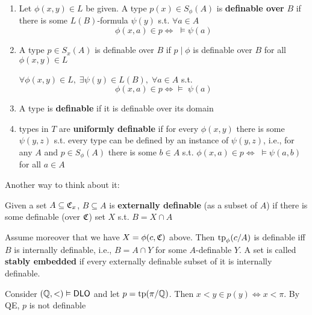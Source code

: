 \documentclass[11pt]{article}
\begin{document}
\begin{definition}[]
\begin{enumerate}
\item Let \(\phi(x,y)\in L\) be given. A type \(p(x)\in S_\phi(A)\) is \textbf{definable over} \(B\) if there is
some \(L(B)\)-formula \(\psi(y)\) s.t. \(\forall a\in A\)
\begin{equation*}
\phi(x,a)\in p\Leftrightarrow\;\vDash\psi(a)
\end{equation*}
\item A type \(p\in S_x(A)\) is definable over \(B\) if \(p\mid\phi\) is definable over \(B\) for
all \(\phi(x,y)\in L\)

\(\forall\phi(x,y)\in L,\;\exists\psi(y)\in L(B),\;\forall a\in A\) s.t.
\begin{equation*}
\phi(x,a)\in p\Leftrightarrow\vDash\;\psi(a)
\end{equation*}
\item A type is \textbf{definable} if it is definable over its domain
\item types in \(T\) are \textbf{uniformly definable} if for every \(\phi(x,y)\) there is some \(\psi(y,z)\) s.t.
every type can be defined by an instance of \(\psi(y,z)\), i.e., for any \(A\) and \(p\in S_\phi(A)\)
there is some \(b\in A\) s.t. \(\phi(x,a)\in p\Leftrightarrow\;\vDash\psi(a,b)\) for all \(a\in A\)
\end{enumerate}
\end{definition}

\begin{remark}
Another way to think about it:

Given a set \(A\subseteq\mathfrak{C}_x\), \(B\subseteq A\) is \textbf{externally definable} (as a subset of \(A\)) if there is some
definable (over \(\mathfrak{C}\)) set \(X\) s.t. \(B=X\cap A\)

Assume moreover that we have \(X=\phi(c,\mathfrak{C})\) above. Then \(\operatorname{tp}_\phi(c/A)\) is definable iff \(B\) is
internally definable, i.e., \(B=A\cap Y\) for some \(A\)-definable \(Y\). A set is called \textbf{stably
embedded} if every externally definable subset of it is internally definable.
\end{remark}

\begin{examplle}[]
Consider \((\mathbb{Q},<)\vDash\operatorname{\textsf{DLO}}\) and let \(p=\operatorname{tp}(\pi/\mathbb{Q})\). Then \(x<y\in p(y)\Leftrightarrow x<\pi\). By QE, \(p\) is not definable
\end{examplle}
\end{document}
